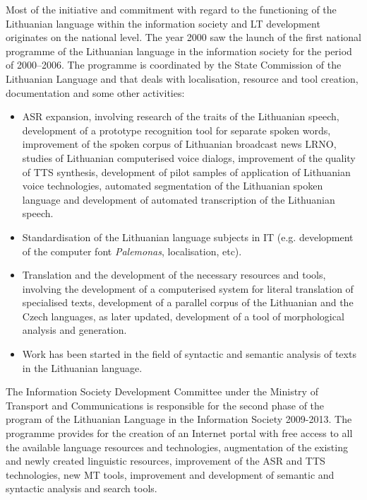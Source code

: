 \begin{multicols}{2}
Most of the initiative and commitment with regard to the functioning of the Lithuanian language within the information society and LT development originates on the national level. The year 2000 saw the launch of the first national programme of the Lithuanian language in the information society for the period of 2000–2006. The programme is coordinated by the State Commission of the Lithuanian Language and that deals with localisation, resource and tool creation, documentation and some other activities:
\begin{itemize}
      \item ASR expansion, involving research of the traits of the Lithuanian speech, development of a prototype recognition tool for separate spoken words, improvement of the spoken corpus of Lithuanian broadcast news LRNO, studies of Lithuanian computerised voice dialogs, improvement of the quality of TTS synthesis, development of pilot samples of application of Lithuanian voice technologies, automated segmentation of the Lithuanian spoken language and development of automated transcription of the Lithuanian speech.
      \item Standardisation of the Lithuanian language subjects in IT (e.g. development of the computer font \textit{Palemonas}, localisation, etc).
      \item Translation and the development of the necessary resources and tools, involving the development of a computerised system for literal translation of specialised texts, development of a parallel corpus of the Lithuanian and the Czech languages, as later updated, development of a tool of morphological analysis and generation.
      \item Work has been started in the field of syntactic and semantic analysis of texts in the Lithuanian language. 
          \end{itemize}

    The Information Society Development Committee under the Ministry of Transport and Communications is responsible for the second phase of the program of the Lithuanian Language in the Information Society 2009-2013. The programme provides for the creation of an Internet portal with free access to all the available language resources and technologies, augmentation of the existing and newly created linguistic resources, improvement of the ASR and TTS technologies, new MT tools, improvement and development of semantic and syntactic analysis and search tools.


\end{multicols}

